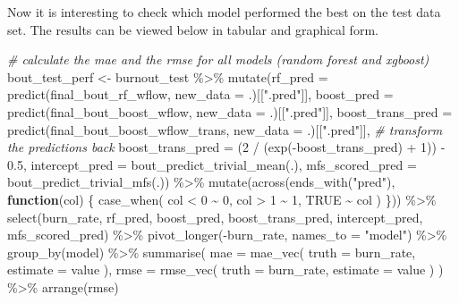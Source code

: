 \documentclass[
]{book}
\newenvironment{Shaded}{\begin{snugshade}}{\end{snugshade}}
\newcommand{\AttributeTok}[1]{\textcolor[rgb]{0.77,0.63,0.00}{#1}}
\newcommand{\CommentTok}[1]{\textcolor[rgb]{0.56,0.35,0.01}{\textit{#1}}}
\newcommand{\ConstantTok}[1]{\textcolor[rgb]{0.00,0.00,0.00}{#1}}
\newcommand{\ControlFlowTok}[1]{\textcolor[rgb]{0.13,0.29,0.53}{\textbf{#1}}}
\newcommand{\DecValTok}[1]{\textcolor[rgb]{0.00,0.00,0.81}{#1}}
\newcommand{\FloatTok}[1]{\textcolor[rgb]{0.00,0.00,0.81}{#1}}
\newcommand{\FunctionTok}[1]{\textcolor[rgb]{0.00,0.00,0.00}{#1}}
\newcommand{\NormalTok}[1]{#1}
\newcommand{\OtherTok}[1]{\textcolor[rgb]{0.56,0.35,0.01}{#1}}
\newcommand{\SpecialCharTok}[1]{\textcolor[rgb]{0.00,0.00,0.00}{#1}}
\newcommand{\StringTok}[1]{\textcolor[rgb]{0.31,0.60,0.02}{#1}}
\begin{document}
Now it is interesting to check which model performed the best on the test data set. The results can be viewed below in tabular and graphical form.

\begin{Shaded}
\begin{Highlighting}[]
\CommentTok{\# calculate the mae and the rmse for all models (random forest and xgboost)}
\NormalTok{bout\_test\_perf }\OtherTok{\textless{}{-}}\NormalTok{ burnout\_test }\SpecialCharTok{\%\textgreater{}\%}
  \FunctionTok{mutate}\NormalTok{(}\AttributeTok{rf\_pred =} \FunctionTok{predict}\NormalTok{(final\_bout\_rf\_wflow,}
                           \AttributeTok{new\_data =}\NormalTok{ .)[[}\StringTok{".pred"}\NormalTok{]],}
         \AttributeTok{boost\_pred =} \FunctionTok{predict}\NormalTok{(final\_bout\_boost\_wflow,}
                              \AttributeTok{new\_data =}\NormalTok{ .)[[}\StringTok{".pred"}\NormalTok{]],}
         \AttributeTok{boost\_trans\_pred =} \FunctionTok{predict}\NormalTok{(final\_bout\_boost\_wflow\_trans,}
                              \AttributeTok{new\_data =}\NormalTok{ .)[[}\StringTok{".pred"}\NormalTok{]],}
         \CommentTok{\# transform the predictions back}
         \AttributeTok{boost\_trans\_pred =}\NormalTok{ (}\DecValTok{2} \SpecialCharTok{/}\NormalTok{ (}\FunctionTok{exp}\NormalTok{(}\SpecialCharTok{{-}}\NormalTok{boost\_trans\_pred) }\SpecialCharTok{+} \DecValTok{1}\NormalTok{)) }\SpecialCharTok{{-}} \FloatTok{0.5}\NormalTok{,}
         \AttributeTok{intercept\_pred =} \FunctionTok{bout\_predict\_trivial\_mean}\NormalTok{(.),}
         \AttributeTok{mfs\_scored\_pred =} \FunctionTok{bout\_predict\_trivial\_mfs}\NormalTok{(.)) }\SpecialCharTok{\%\textgreater{}\%}
  \FunctionTok{mutate}\NormalTok{(}\FunctionTok{across}\NormalTok{(}\FunctionTok{ends\_with}\NormalTok{(}\StringTok{"pred"}\NormalTok{), }\ControlFlowTok{function}\NormalTok{(col) \{}
    \FunctionTok{case\_when}\NormalTok{(}
\NormalTok{      col }\SpecialCharTok{\textless{}} \DecValTok{0} \SpecialCharTok{\textasciitilde{}} \DecValTok{0}\NormalTok{,}
\NormalTok{      col }\SpecialCharTok{\textgreater{}} \DecValTok{1} \SpecialCharTok{\textasciitilde{}} \DecValTok{1}\NormalTok{,}
      \ConstantTok{TRUE} \SpecialCharTok{\textasciitilde{}}\NormalTok{ col}
\NormalTok{      )}
\NormalTok{  \})) }\SpecialCharTok{\%\textgreater{}\%}
  \FunctionTok{select}\NormalTok{(burn\_rate, rf\_pred, boost\_pred, boost\_trans\_pred,}
\NormalTok{         intercept\_pred, mfs\_scored\_pred) }\SpecialCharTok{\%\textgreater{}\%}
  \FunctionTok{pivot\_longer}\NormalTok{(}\SpecialCharTok{{-}}\NormalTok{burn\_rate, }\AttributeTok{names\_to =} \StringTok{"model"}\NormalTok{) }\SpecialCharTok{\%\textgreater{}\%}
  \FunctionTok{group\_by}\NormalTok{(model) }\SpecialCharTok{\%\textgreater{}\%}
  \FunctionTok{summarise}\NormalTok{(}
    \AttributeTok{mae =} \FunctionTok{mae\_vec}\NormalTok{(}
      \AttributeTok{truth =}\NormalTok{ burn\_rate,}
      \AttributeTok{estimate =}\NormalTok{ value}
\NormalTok{    ),}
    \AttributeTok{rmse =} \FunctionTok{rmse\_vec}\NormalTok{(}
      \AttributeTok{truth =}\NormalTok{ burn\_rate,}
      \AttributeTok{estimate =}\NormalTok{ value}
\NormalTok{    )}
\NormalTok{  ) }\SpecialCharTok{\%\textgreater{}\%}
  \FunctionTok{arrange}\NormalTok{(rmse)}


\end{Highlighting}
\end{Shaded}
\end{document}
